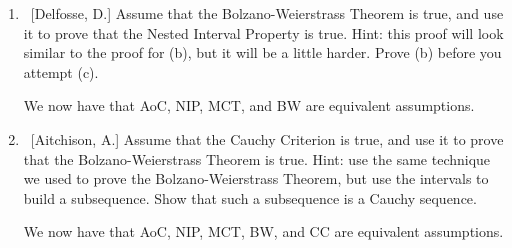 \documentclass[10pt]{article}
\theoremstyle{definition}
\newtheorem{lemma}{Lemma}
\begin{document}
\begin{enumerate}
\begin{enumerate}
		\begin{lemma}
		If $(a_n)$ is an increasing sequence that converges to $a$, then $a_n \leq a$, for all $n \in \mathbb{N}$.  A similar result holds for decreasing sequences.
		\end{lemma}
	
	We now have that AoC, NIP, and MCT are equivalent assumptions.
	
	\item  ~[Delfosse, D.] Assume that the Bolzano-Weierstrass Theorem is true, and use it to prove that the Nested Interval Property is true.  Hint: this proof will look similar to the proof for (b), but it will be a little harder.  Prove (b) before you attempt (c).
	
	We now have that AoC, NIP, MCT, and BW are equivalent assumptions.
	
	\item  ~[Aitchison, A.] Assume that the Cauchy Criterion is true, and use it to prove that the Bolzano-Weierstrass Theorem is true.  Hint: use the same technique we used to prove the Bolzano-Weierstrass Theorem, but use the intervals to build a subsequence.  Show that such a subsequence is a Cauchy sequence.
	
	We now have that AoC, NIP, MCT, BW, and CC are equivalent assumptions.
	
	\end{enumerate}


\end{enumerate}
\end{document}
